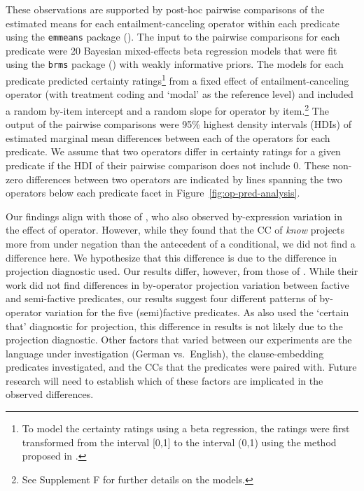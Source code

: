 \documentclass[a4paper,12pt,twoside]{article}
\begin{document}
        These observations are supported by post-hoc pairwise comparisons of the estimated means for each entailment-canceling operator within each predicate using the \texttt{emmeans} package (\citealt{emmeans}). The input to the pairwise comparisons for each predicate were 20 Bayesian mixed-effects beta regression models that were fit using the \texttt{brms} package (\citealt{buerkner2017}) with weakly informative priors. The models for each predicate predicted certainty ratings\footnote{To model the certainty ratings using a beta regression, the ratings were first transformed from the interval [0,1] to the interval (0,1) using the method proposed in \citealt{smithson_better_2006}.} from a fixed effect of entailment-canceling operator (with treatment coding and `modal' as the reference level) and included a random by-item intercept and a random slope for operator by item.\footnote{See Supplement F for further details on the models.} The output of the pairwise comparisons were 95\% highest density intervals (HDIs) of estimated marginal mean differences between each of the operators for each predicate. We assume that two operators differ in certainty ratings for a given predicate if the HDI of their pairwise comparison does not include 0. These non-zero differences between two operators are indicated by lines spanning the two operators below each predicate facet in Figure~\ref{fig:op-pred-analysis}.


        Our findings align with those of \citealt{smith_relationship_2014}, who also observed by-expression variation in the effect of operator. However, while they found that the CC of \emph{know} projects more from under negation than the antecedent of a conditional, we did not find a difference here. We hypothesize that this difference is due to the difference in projection diagnostic used. Our results differ, however, from those of \citealt{sieker_projective_2022}. While their work did not find differences in by-operator projection variation between factive and semi-factive predicates, our results suggest four different patterns of by-operator variation for the five (semi)factive predicates. As \citealt{sieker_projective_2022} also used the `certain that' diagnostic for projection, this difference in results is not likely due to the projection diagnostic. Other factors that varied between our experiments are the language under investigation (German vs.\ English), the clause-embedding predicates investigated, and the CCs that the predicates were paired with. Future research will need to establish which of these factors are implicated in the observed differences.
   
\end{document}
